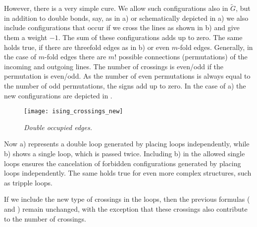 %
However, there is a very simple cure. We allow such configurations also in $\tilde G$, but in addition to double bonds, say, as in   a) or schematically depicted in  a)
we also include configurations that occur if we cross the lines as shown  in  b) and give them a weight $-1$. 
The sum of these configurations adds up to zero.
The same holds true, if there are threefold
edges as in  b) or even $m$-fold edges. Generally, in the case of $m$-fold edges there are $m!$ possible connections (permutations) of the incoming and outgoing lines. The number of crossings is even/odd  if the permutation is even/odd. As the number of even permutations is always equal to the number of odd permutations, the signs add up to zero.
In the case of  a) the new configurations are depicted in
.
%
\begin{figure}[t]
\texttt{[image: ising\_crossings\_new]}
\caption{{\it Double occupied edges.}\label{fig:ising:crossings:new}}
\end{figure}
%
Now a) represents a double loop generated by placing loops independently, while b)
shows a single loop, which is passed twice. Including b) in the allowed single loops
ensures the cancelation of forbidden configurations generated by placing loops independently.
The same holds true for even more complex structures, such as tripple loops.

If we include the new type of crossings in the loops, then the previous formulas
 ( and )  remain unchanged, with the exception that these crossings also contribute to the number of crossings.
 
 

